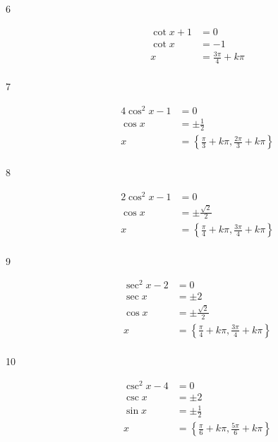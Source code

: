 \documentclass{exam}
\begin{document}
\begin{description}
      \item[6] 
        \begin{align*}
          \cot x + 1 & = 0 \\
          \cot x     & = -1 \\
          x          & = \boxed{ \frac{3 \pi}{4} + k \pi } \\
        \end{align*}

      \item[7] 
        \begin{align*}
          4 \cos^2 x - 1 & = 0 \\
          \cos x         & = \pm \frac{1}{2} \\
          x              & = \boxed{ \left\{ \frac{\pi}{3} + k \pi, \frac{2 \pi}{3} + k \pi \right\} } \\
        \end{align*}

      \item[8] 
        \begin{align*}
          2 \cos^2 x - 1 & = 0 \\
          \cos x         & = \pm \frac{\sqrt{2}}{2} \\
          x              & = \boxed{ \left\{ \frac{\pi}{4} + k \pi, \frac{3 \pi}{4} + k \pi \right\} } \\
        \end{align*}

      \item[9] 
        \begin{align*}
          \sec^2 x - 2 & = 0 \\
          \sec x         & = \pm 2 \\
          \cos x         & = \pm \frac{\sqrt{2}}{2} \\
          x              & = \boxed{ \left\{ \frac{\pi}{4} + k \pi, \frac{3 \pi}{4} + k \pi \right\} } \\
        \end{align*}

      \item[10] 
        \begin{align*}
          \csc^2 x - 4 & = 0 \\
          \csc x         & = \pm 2 \\
          \sin x         & = \pm \frac{1}{2} \\
          x              & = \boxed{ \left\{ \frac{\pi}{6} + k \pi, \frac{5 \pi}{6} + k \pi \right\} } \\
        \end{align*}


\end{description}
\end{document}
